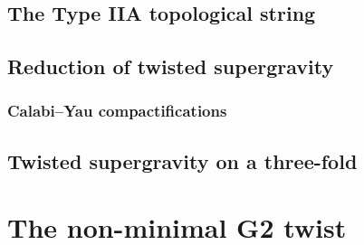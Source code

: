 \documentclass[11pt]{article}
\begin{document}
\subsection{The Type IIA topological string}
\label{sec:org02b0f82}
\subsection{Reduction of twisted supergravity}
\label{sec:org59003d2}
\subsubsection{Calabi--Yau compactifications}
\label{sec:org55d712d}
\subsection{Twisted supergravity on a three-fold}
\label{sec:org7c4a220}
\section{The non-minimal G2 twist}
\label{sec:orgc520304}
\end{document}
